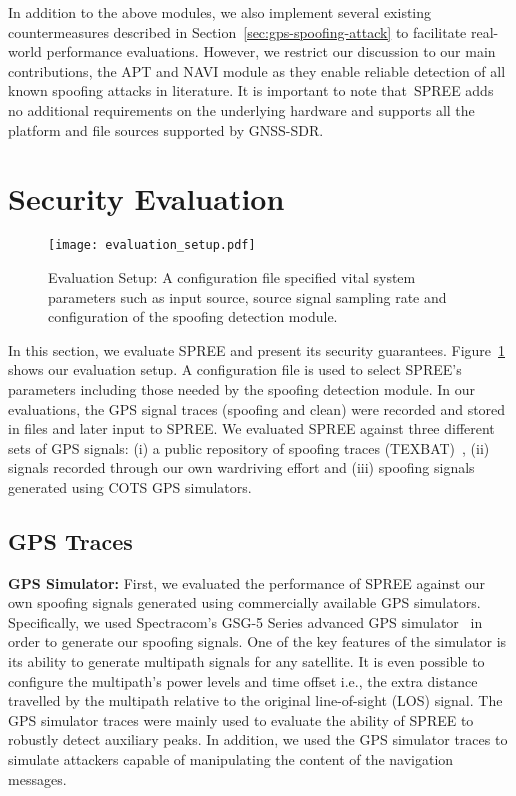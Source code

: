 \documentclass[letterpaper,twocolumn,10pt]{article}
\newcommand{\ie}{i.e.,\xspace}
\newcommand{\rxname}{SPREE\xspace}
\begin{document}
In addition to the above modules, we also implement several existing countermeasures described in Section~\ref{sec:gps-spoofing-attack} to facilitate real-world performance evaluations. However, we restrict our discussion to our main contributions, the APT and NAVI module as they enable reliable detection of all known spoofing attacks in literature. It is important to note that~\rxname adds no additional requirements on the underlying hardware and supports all the platform and file sources supported by GNSS-SDR.








\section{Security Evaluation}
\label{sec:evaluation}
\begin{figure}[t]
\centering
  \texttt{[image: evaluation\_setup.pdf]}
  \caption{Evaluation Setup: A configuration file specified vital system parameters such as input source, source signal sampling rate and configuration of the spoofing detection module.}
  \label{fig:evaluation-setup}
\end{figure}
In this section, we evaluate \rxname and present its security guarantees. Figure~\ref{fig:evaluation-setup} shows our evaluation setup. A configuration file is used to select \rxname's parameters including those needed by the spoofing detection module. In our evaluations, the GPS signal traces (spoofing and clean) were recorded and stored in files and later input to \rxname. We evaluated \rxname against three different sets of GPS signals: (i) a public repository of spoofing traces (TEXBAT)~\cite{humphreys2012texas}, (ii) signals recorded through our own wardriving effort and (iii) spoofing signals generated using COTS GPS simulators.\\




\subsection{GPS Traces}
\noindent\textbf{GPS Simulator:} First, we evaluated the performance of \rxname against our own spoofing signals generated using commercially available GPS simulators. Specifically, we used Spectracom's GSG-5 Series advanced GPS simulator~\cite{spectracom} in order to generate our spoofing signals. One of the key features of the simulator is its ability to generate multipath signals for any satellite. It is even possible to configure the multipath's power levels and time offset \ie the extra distance travelled by the multipath relative to the original line-of-sight (LOS) signal. The GPS simulator traces were mainly used to evaluate the ability of \rxname to robustly detect auxiliary peaks. In addition, we used the GPS simulator traces to simulate attackers capable of manipulating the content of the navigation messages.\\
\end{document}
